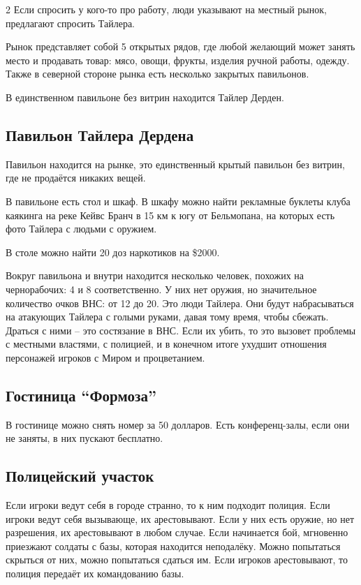 \documentclass[twoside]{article}
\begin{document}
\begin{multicols}{2}
Если спросить у кого-то про работу, люди указывают на местный рынок,
предлагают спросить Тайлера.

Рынок представляет собой 5 открытых рядов, где любой желающий может
занять место и продавать товар: мясо, овощи, фрукты, изделия ручной
работы, одежду. Также в северной стороне рынка есть несколько закрытых
павильонов.

В единственном павильоне без витрин находится Тайлер Дерден.

\subsection{Павильон Тайлера Дердена}\label{tyler-den-pavilion}

Павильон находится на рынке, это единственный крытый павильон без
витрин, где не продаётся никаких вещей.

В павильоне есть стол и шкаф. В шкафу можно найти рекламные буклеты
клуба каякинга на реке Кейвс Бранч в 15 км к югу от Бельмопана, на
которых есть фото Тайлера с людьми с оружием.

В столе можно найти 20 доз наркотиков на \$2000.

Вокруг павильона и внутри находится несколько человек, похожих на
чернорабочих: 4 и 8 соответственно. У них нет оружия, но значительное
количество очков ВНС: от 12 до 20. Это люди Тайлера. Они будут
набрасываться на атакующих Тайлера с голыми руками, давая тому время,
чтобы сбежать. Драться с ними -- это состязание в ВНС. Если их убить, то
это вызовет проблемы с местными властями, с полицией, и в конечном итоге
ухудшит отношения персонажей игроков с Миром и процветанием.

\subsection{Гостиница \enquote{Формоза}}\label{formosa-hotel}

В гостинице можно снять номер за 50 долларов. Есть конференц-залы, если
они не заняты, в них пускают бесплатно.

\subsection{Полицейский участок}\label{police-station}

Если игроки ведут себя в городе странно, то к ним подходит полиция. Если
игроки ведут себя вызывающе, их арестовывают. Если у них есть оружие, но
нет разрешения, их арестовывают в любом случае. Если начинается бой,
мгновенно приезжают солдаты с базы, которая находится неподалёку. Можно
попытаться скрыться от них, можно попытаться сдаться им. Если игроков
арестовывают, то полиция передаёт их командованию базы.


\end{multicols}
\end{document}

